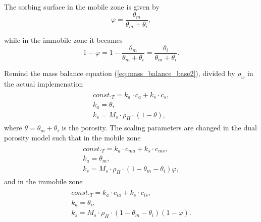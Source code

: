The sorbing surface in the mobile zone is given by
\begin{equation}
  \varphi = \frac{\theta_m}{\theta_m + \theta_i}, 
\end{equation}

while in the immobile zone it becames
\[ 1 - \varphi = 1-\frac{\theta_m}{\theta_m + \theta_i} = \frac{\theta_i}{\theta_m + \theta_i}. \]

Remind the mass balance equation (\ref{eq:mass_balance_base2}), divided by $\rho_w$ in the actual implemenation
\begin{eqnarray}
 \begin{array}{l}
  const._T = k_a\cdot c_a + k_s\cdot c_s,\\
  k_a = \theta, \\
  k_s = M_s \cdot\rho_H\cdot(1-\theta),
 \end{array}
 \label{eq:scale_params}
\end{eqnarray}
where $\theta = \theta_m + \theta_i$ is the porosity.
The scaling parameters are changed in the dual porosity model such that in the mobile zone
\begin{eqnarray}
 \begin{array}{l}
  const._T = k_a\cdot c_{ma} + k_s\cdot c_{ms},\\
  k_a = \theta_m, \\
  k_s = M_s \cdot\rho_H\cdot(1-\theta_m - \theta_i)\varphi,
 \end{array}
 \label{eq:scale_params_m}
\end{eqnarray}
and in the immobile zone
\begin{eqnarray}
 \begin{array}{l}
  const._T = k_a\cdot c_{ia} + k_s\cdot c_{is},\\
  k_a = \theta_i, \\
  k_s = M_s \cdot\rho_H\cdot(1-\theta_m - \theta_i)(1 - \varphi).
 \end{array}
 \label{eq:scale_params_i}
\end{eqnarray}
